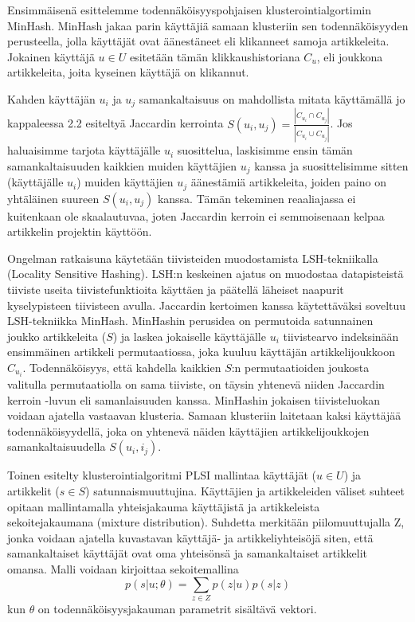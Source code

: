 \documentclass[12pt,finnish]{tktltiki2}
\theoremstyle{definition}
\theoremstyle{remark}
\begin{document}
Ensimmäisenä esittelemme todennäköisyyspohjaisen klusterointialgortimin MinHash. MinHash jakaa parin käyttäjiä samaan klusteriin sen todennäköisyyden perusteella, jolla käyttäjät ovat äänestäneet eli klikanneet samoja artikkeleita. Jokainen käyttäjä $u \in U$ esitetään tämän klikkaushistoriana $C_u$, eli joukkona artikkeleita, joita kyseinen käyttäjä on klikannut.

Kahden käyttäjän $u_i$ ja $u_j$ samankaltaisuus on mahdollista mitata käyttämällä jo kappaleessa 2.2 esiteltyä Jaccardin kerrointa $S(u_i, u_j) = \frac{|C_{u_{i}} \cap C_{u_{j}}|}{|C_{u_{i}} \cup C_{u_{j}}|}$. Jos haluaisimme tarjota käyttäjälle $u_i$ suosittelua, laskisimme ensin tämän samankaltaisuuden kaikkien muiden käyttäjien $u_j$ kanssa ja suosittelisimme sitten (käyttäjälle $u_i$) muiden käyttäjien $u_j$ äänestämiä artikkeleita, joiden paino on yhtäläinen suureen $S(u_i, u_j)$ kanssa. Tämän tekeminen reaaliajassa ei kuitenkaan ole skaalautuvaa, joten Jaccardin kerroin ei semmoisenaan kelpaa artikkelin projektin käyttöön.

Ongelman ratkaisuna käytetään tiivisteiden muodostamista LSH-tekniikalla (Locality Sensitive Hashing). LSH:n keskeinen ajatus on muodostaa datapisteistä tiiviste useita tiivistefunktioita käyttäen ja päätellä läheiset naapurit kyselypisteen tiivisteen avulla. Jaccardin kertoimen kanssa käytettäväksi soveltuu LSH-tekniikka MinHash. MinHashin perusidea on permutoida satunnainen joukko artikkeleita ($S$) ja laskea jokaiselle käyttäjälle $u_i$ tiivistearvo indeksinään ensimmäinen artikkeli permutaatiossa, joka kuuluu käyttäjän artikkelijoukkoon $C_{u_{i}}$. Todennäköisyys, että kahdella kaikkien $S$:n permutaatioiden joukosta valitulla permutaatiolla on sama tiiviste, on täysin yhtenevä  niiden Jaccardin kerroin -luvun eli samanlaisuuden kanssa. MinHashin jokaisen tiivisteluokan voidaan ajatella vastaavan klusteria. Samaan klusteriin laitetaan kaksi käyttäjää todennäköisyydellä, joka on yhtenevä näiden käyttäjien artikkelijoukkojen samankaltaisuudella $S(u_i, i_j)$.

Toinen esitelty klusterointialgoritmi PLSI mallintaa käyttäjät ($u \in U$) ja artikkelit ($s \in S$) satunnaismuuttujina.
Käyttäjien ja artikkeleiden väliset suhteet opitaan mallintamalla yhteisjakauma käyttäjistä ja artikkeleista sekoitejakaumana (mixture distribution).
Suhdetta merkitään piilomuuttujalla Z, jonka voidaan ajatella kuvastavan käyttäjä- ja artikkeliyhteisöjä siten, että samankaltaiset käyttäjät ovat oma yhteisönsä ja samankaltaiset artikkelit omansa. Malli voidaan kirjoittaa sekoitemallina
\begin{displaymath}
p(s|u;\theta)= \sum_{z \in Z} {p(z|u)}{p(s|z)}
\end{displaymath}
kun $\theta$ on todennäköisyysjakauman parametrit sisältävä vektori.
\end{document}
